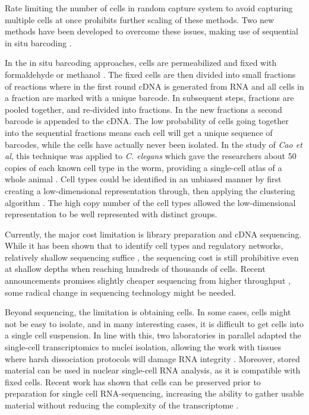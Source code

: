 Rate limiting the number of cells in random capture system to avoid capturing multiple cells at once prohibits further scaling of these methods. Two new methods have been developed to overcome these issues, making use of sequential in situ barcoding \cite{Rosenberg2017-jt, Cao2017-ux}.

In the in situ barcoding approaches, cells are permeabilized and fixed with formaldehyde \cite{Rosenberg2017-jt} or methanol \cite{Cao2017-ux}. The fixed cells are then divided into small fractions of reactions where in the first round cDNA is generated from RNA and all cells in a fraction are marked with a unique barcode. In subsequent steps, fractions are pooled together, and re-divided into fractions. In the new fractions a second barcode is appended to the cDNA. The low probability of cells going together into the sequential fractions means each cell will get a unique sequence of barcodes, while the cells have actually never been isolated. In the study of \textit{Cao et al}, this technique was applied to \textit{C. elegans} which gave the researchers about 50 copies of each known cell type in the worm, providing a single-cell atlas of a whole animal \cite{Cao2017-ux}. Cell types could be identified in an unbiased manner by first creating a low-dimensional representation through, then applying the  clustering algorithm \cite{Rodriguez2014-mc}. The high copy number of the cell types allowed the low-dimensional representation to be well represented with distinct groups.

Currently, the major cost limitation is library preparation and cDNA sequencing. While it has been shown that to identify cell types and regulatory networks, relatively shallow sequencing suffice \cite{Heimberg2016-qw, Pollen2014-cs}, the sequencing cost is still prohibitive even at shallow depths when reaching hundreds of thousands of cells. Recent announcements promises slightly cheaper sequencing from higher throughput \cite{Illumina_Inc2017-zg}, some radical change in sequencing technology might be needed.

Beyond sequencing, the limitation is obtaining cells. In some cases, cells might not be easy to isolate, and in many interesting cases, it is difficult to get cells into a single cell suspension. In line with this, two laboratories in parallel adapted the single-cell transcriptomics to nuclei isolation, allowing the work with tissues where harsh dissociation protocols will damage RNA integrity \cite{Habib2016-jm, Habib2017-jk, Lake2016-zb}. Moreover, stored material can be used in nuclear single-cell RNA analysis, as it is compatible with fixed cells. Recent work has shown that cells can be preserved prior to preparation for single cell RNA-sequencing, increasing the ability to gather usable material without reducing the complexity of the transcriptome \cite{Guillaumet-Adkins2017-po, Alles2017-vi}.

